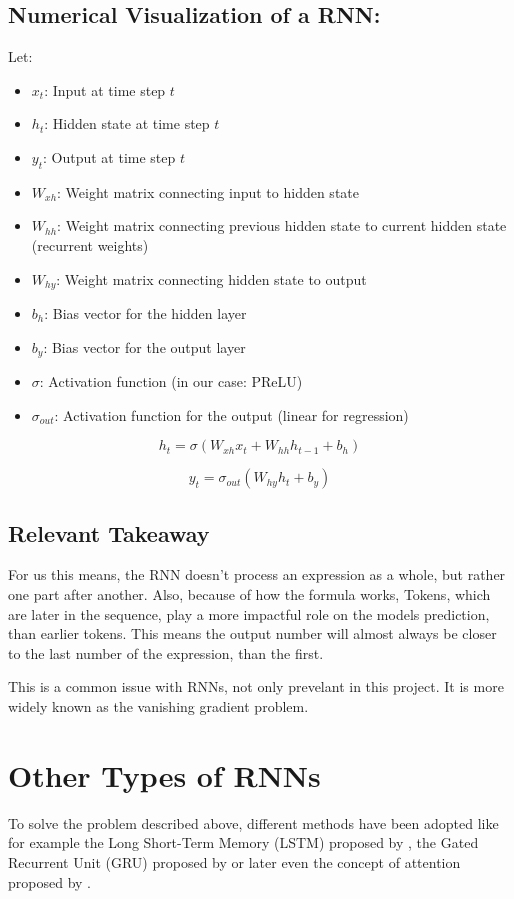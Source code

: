 \documentclass{article}
\begin{document}
\subsection{Numerical Visualization of a RNN:}
Let:
\begin{itemize}
    \item $x_t$: Input at time step $t$
    \item $h_t$: Hidden state at time step $t$
    \item $y_t$: Output at time step $t$
    \item $W_{xh}$: Weight matrix connecting input to hidden state
    \item $W_{hh}$: Weight matrix connecting previous hidden state to current hidden state (recurrent weights)
    \item $W_{hy}$: Weight matrix connecting hidden state to output
    \item $b_h$: Bias vector for the hidden layer
    \item $b_y$: Bias vector for the output layer
    \item $\sigma$: Activation function (in our case: PReLU)
    \item $\sigma_{out}$: Activation function for the output (linear for regression)
\end{itemize}



$$h_t = \sigma(W_{xh}x_t + W_{hh}h_{t-1} + b_h)$$

$$y_t = \sigma_{out}(W_{hy}h_t + b_y)$$

\subsection{Relevant Takeaway}
For us this means, the RNN doesn't process an expression as a whole, but 
rather one part after another.
Also, because of how the formula works, Tokens, which are later in the 
sequence, play a more impactful role on the models prediction, than earlier 
tokens. This means the output number will almost always be closer to the 
last number of the expression, than the first.

This is a common issue with RNNs, not only prevelant in this project. It is 
more widely known as the vanishing gradient problem.

\section{Other Types of RNNs}
To solve the problem described above, different methods have been adopted 
like for example the Long Short-Term Memory (LSTM) proposed by \cite{6795963}, 
the Gated Recurrent Unit (GRU) proposed by \cite{cho2014propertiesneuralmachinetranslation} 
or later even the concept of attention proposed by \cite{bahdanau2016neuralmachinetranslationjointly}.
\end{document}

